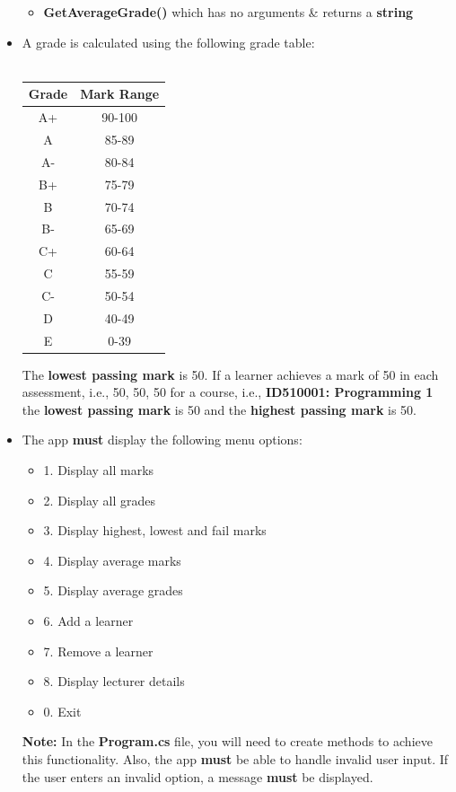\documentclass{article}
\begin{document}
\begin{itemize}
\begin{itemize}
        \item \textbf{GetAverageGrade()} which has no arguments \& returns a \textbf{string}
    \end{itemize}
    \item A grade is calculated using the following grade table:\\\\
    \renewcommand{\arraystretch}{1.5}
    \begin{tabular}{|c|c|}
        \hline
        \textbf{Grade} & \textbf{Mark Range} \\ \hline
        A+ & 90-100  \\ \hline
        A & 85-89  \\ \hline
        A- & 80-84 \\ \hline
        B+ & 75-79   \\ \hline
        B & 70-74  \\ \hline
        B- & 65-69  \\ \hline
        C+ & 60-64  \\ \hline
        C & 55-59 \\ \hline
        C- & 50-54  \\ \hline
        D & 40-49   \\ \hline
        E & 0-39   \\ \hline
    \end{tabular}
    The \textbf{lowest passing mark} is 50. If a learner achieves a mark of 50 in each assessment, i.e., 50, 50, 50 for a course, i.e., \textbf{ID510001: Programming 1} the \textbf{lowest passing mark} is 50 and the \textbf{highest passing mark} is 50.
    \item The app \textbf{must} display the following menu options:
    \begin{itemize}
        \item 1. Display all marks
        \item 2. Display all grades
        \item 3. Display highest, lowest and fail marks
        \item 4. Display average marks
        \item 5. Display average grades
        \item 6. Add a learner
        \item 7. Remove a learner
        \item 8. Display lecturer details
        \item 0. Exit
    \end{itemize}
    \textbf{Note:} In the \textbf{Program.cs} file, you will need to create methods to achieve this functionality. Also, the app \textbf{must} be able to handle invalid user input. If the user enters an invalid option, a message \textbf{must} be displayed.

\end{itemize}
\end{document}
